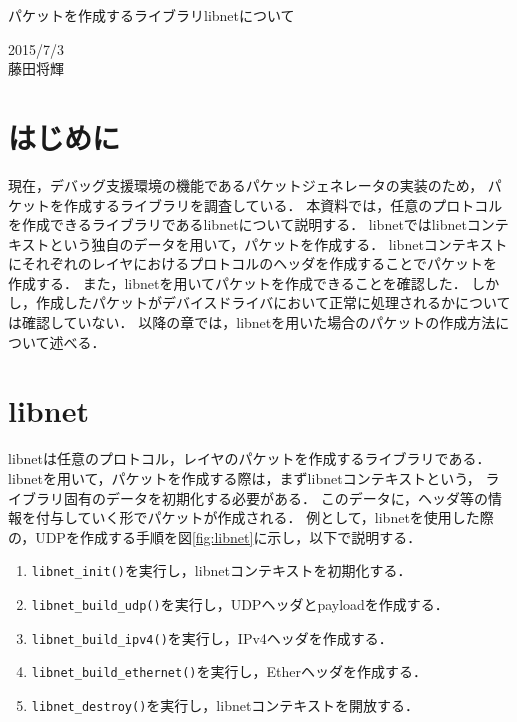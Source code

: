 \documentclass[12pt]{jsarticle}
\begin{document}

\begin{center}
    {\LARGE パケットを作成するライブラリlibnetについて}
\end{center}

\begin{flushright}
  2015/7/3\\
  藤田将輝
\end{flushright}
\section{はじめに}
現在，デバッグ支援環境の機能であるパケットジェネレータの実装のため，
パケットを作成するライブラリを調査している．
本資料では，任意のプロトコルを作成できるライブラリであるlibnetについて説明する．
libnetではlibnetコンテキストという独自のデータを用いて，パケットを作成する．
libnetコンテキストにそれぞれのレイヤにおけるプロトコルのヘッダを作成することでパケットを
作成する．
また，libnetを用いてパケットを作成できることを確認した．
しかし，作成したパケットがデバイスドライバにおいて正常に処理されるかについては確認していない．
以降の章では，libnetを用いた場合のパケットの作成方法について述べる．
\section{libnet}
libnetは任意のプロトコル，レイヤのパケットを作成するライブラリである．
libnetを用いて，パケットを作成する際は，まずlibnetコンテキストという，
ライブラリ固有のデータを初期化する必要がある．
このデータに，ヘッダ等の情報を付与していく形でパケットが作成される．
例として，libnetを使用した際の，UDPを作成する手順を図\ref{fig:libnet}に示し，以下で説明する．
\begin{enumerate}
    \item {\tt libnet\_init()}を実行し，libnetコンテキストを初期化する．
    \item {\tt libnet\_build\_udp()}を実行し，UDPヘッダとpayloadを作成する．
    \item {\tt libnet\_build\_ipv4()}を実行し，IPv4ヘッダを作成する．
    \item {\tt libnet\_build\_ethernet()}を実行し，Etherヘッダを作成する．
    \item {\tt libnet\_destroy()}を実行し，libnetコンテキストを開放する．
\end{enumerate}
\end{document}
